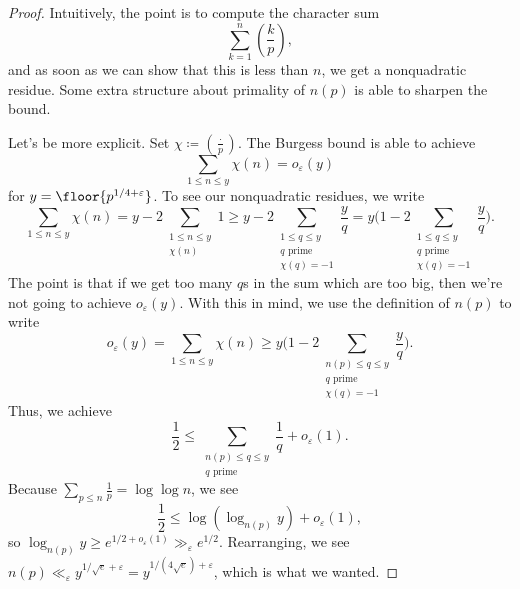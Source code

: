 \documentclass[../notes.tex]{subfiles}
\begin{document}
\begin{proof}
	Intuitively, the point is to compute the character sum
	\[\sum_{k=1}^n\left(\frac kp\right),\]
	and as soon as we can show that this is less than $n$, we get a nonquadratic residue. Some extra structure about primality of $n(p)$ is able to sharpen the bound.

	Let's be more explicit. Set $\chi\coloneqq\left(\frac\cdot p\right)$. The Burgess bound is able to achieve
	\[\sum_{1\le n\le y}\chi(n)=o_\varepsilon(y)\]
	for $y=\floor{p^{1/4+\varepsilon}}$. To see our nonquadratic residues, we write
	\[\sum_{1\le n\le y}\chi(n)=y-2\sum_{\substack{1\le n\le y\\\chi(n)}}1\ge y-2\sum_{\substack{1\le q\le y\\q\text{ prime}\\\chi(q)=-1}}\frac yq=y\Bigg(1-2\sum_{\substack{1\le q\le y\\q\text{ prime}\\\chi(q)=-1}}\frac yq\Bigg).\]
	The point is that if we get too many $q$s in the sum which are too big, then we're not going to achieve $o_\varepsilon(y)$. With this in mind, we use the definition of $n(p)$ to write
	\[o_\varepsilon(y)=\sum_{1\le n\le y}\chi(n)\ge y\Bigg(1-2\sum_{\substack{n(p)\le q\le y\\q\text{ prime}\\\chi(q)=-1}}\frac yq\Bigg).\]
	Thus, we achieve
	\[\frac12\le\sum_{\substack{n(p)\le q\le y\\q\text{ prime}}}\frac1q+o_\varepsilon(1).\]
	Because $\sum_{p\le n}\frac1p=\log\log n$, we see
	\[\frac12\le\log(\log_{n(p)}y)+o_\varepsilon(1),\]
	so $\log_{n(p)}y\ge e^{1/2+o_\varepsilon(1)}\gg_\varepsilon e^{1/2}$. Rearranging, we see $n(p)\ll_\varepsilon y^{1/\sqrt e+\varepsilon}=y^{1/(4\sqrt e)+\varepsilon}$, which is what we wanted.
\end{proof}
\end{document}
